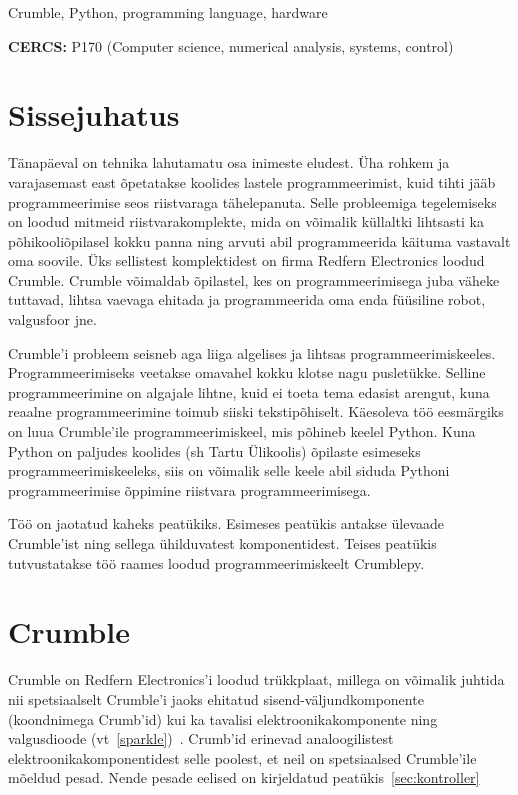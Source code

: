 \documentclass[12pt]{article}
\begin{document}
\vspace*{3ex}
{} Crumble, Python, programming language, hardware
\vspace*{3ex}

\noindent\textbf{CERCS:} P170 (Computer science, numerical analysis, systems, control)



\newpage
{}
\tableofcontents



\section*{Sissejuhatus}
Tänapäeval on tehnika lahutamatu osa inimeste eludest. Üha rohkem ja varajasemast east õpetatakse koolides lastele programmeerimist, kuid tihti jääb programmeerimise seos riistvaraga tähelepanuta. Selle probleemiga tegelemiseks on loodud mitmeid riistvarakomplekte, mida on võimalik küllaltki lihtsasti ka põhikooliõpilasel kokku panna ning arvuti abil programmeerida käituma vastavalt oma soovile. Üks sellistest komplektidest on firma Redfern Electronics loodud Crumble. Crumble võimaldab õpilastel, kes on programmeerimisega juba väheke tuttavad, lihtsa vaevaga ehitada ja programmeerida oma enda füüsiline robot, valgusfoor jne.

Crumble'i probleem seisneb aga liiga algelises ja lihtsas programmeerimiskeeles. Programmeerimiseks veetakse omavahel kokku klotse nagu pusletükke. Selline programmeerimine on algajale lihtne, kuid ei toeta tema edasist arengut, kuna reaalne programmeerimine toimub siiski tekstipõhiselt. Käesoleva töö eesmärgiks on luua Crumble'ile programmeerimiskeel, mis põhineb keelel Python. Kuna Python on paljudes koolides (sh Tartu Ülikoolis) õpilaste esimeseks programmeerimiskeeleks, siis on võimalik selle keele abil siduda Pythoni programmeerimise õppimine riistvara programmeerimisega.

Töö on jaotatud kaheks peatükiks. Esimeses peatükis antakse ülevaade Crumble'ist ning sellega ühilduvatest komponentidest. Teises peatükis tutvustatakse töö raames loodud programmeerimiskeelt Crumblepy.

\section{Crumble}
Crumble on Redfern Electronics’i loodud trükkplaat, millega on võimalik juhtida nii spetsiaalselt Crumble’i jaoks ehitatud sisend-väljundkomponente (koondnimega Crumb’id) kui ka tavalisi elektroonikakomponente ning valgusdioode (vt~\ref{sparkle})~\cite{TheCrumbleController}. Crumb’id erinevad analoogilistest elektroonikakomponentidest selle poolest, et neil on spetsiaalsed Crumble’ile mõeldud pesad. Nende pesade eelised on kirjeldatud peatükis~\ref{sec:kontroller}
\end{document}
